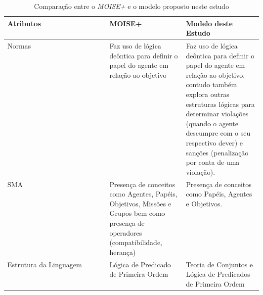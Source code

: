 \begin{table}[H]
\centering
\begin{tabular}{|l|p{0.3\linewidth}|p{0.3\linewidth}|}
\hline			
\textbf{Atributos}
& 
\textbf{MOISE+}  
& 
\textbf{Modelo deste Estudo} 

\\ \hline		 
Normas    
& 
Faz uso de lógica deôntica para definir o papel do agente em relação ao objetivo 
& 
Faz uso de lógica deôntica para definir o papel do agente em relação ao objetivo, contudo também explora outras estruturas lógicas para determinar violações (quando o agente descumpre com o seu respectivo dever) e sanções (penalização por conta de uma violação).  

\\ \hline
SMA        		
& 
Presença de conceitos como Agentes, Papéis, Objetivos, Missões e Grupos bem como presença de  operadores (compatibilidade, herança)  
& 
Presença de conceitos como Papéis, Agentes e Objetivos. 

\\ \hline
Estrutura da Linguagem
& 
Lógica de Predicado de Primeira Ordem 
&
Teoria de Conjuntos e Lógica de Predicados de Primeira Ordem

\\ \hline
\end{tabular}
\caption{Comparação entre o \textit{MOISE+} e o modelo proposto neste estudo}
\label{genmoise2}
\end{table}
